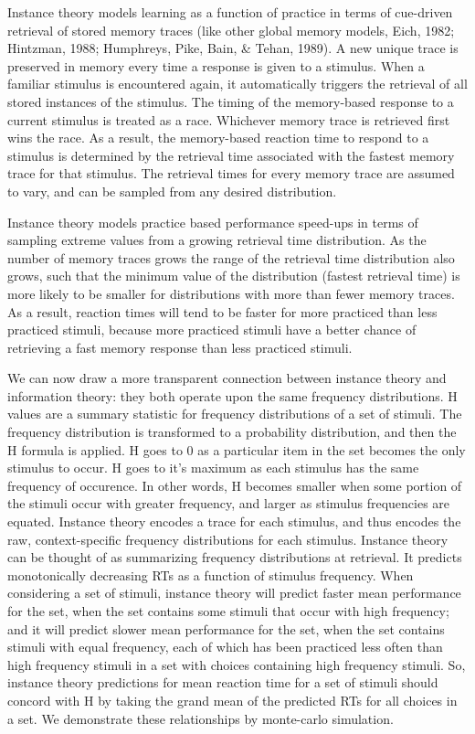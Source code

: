 \documentclass[,man,donotrepeattitle,floatsintext]{apa6}
\begin{document}
Instance theory models learning as a function of practice in terms of cue-driven retrieval of stored memory traces (like other global memory models, Eich, 1982; Hintzman, 1988; Humphreys, Pike, Bain, \& Tehan, 1989). A new unique trace is preserved in memory every time a response is given to a stimulus. When a familiar stimulus is encountered again, it automatically triggers the retrieval of all stored instances of the stimulus. The timing of the memory-based response to a current stimulus is treated as a race. Whichever memory trace is retrieved first wins the race. As a result, the memory-based reaction time to respond to a stimulus is determined by the retrieval time associated with the fastest memory trace for that stimulus. The retrieval times for every memory trace are assumed to vary, and can be sampled from any desired distribution.

Instance theory models practice based performance speed-ups in terms of sampling extreme values from a growing retrieval time distribution. As the number of memory traces grows the range of the retrieval time distribution also grows, such that the minimum value of the distribution (fastest retrieval time) is more likely to be smaller for distributions with more than fewer memory traces. As a result, reaction times will tend to be faster for more practiced than less practiced stimuli, because more practiced stimuli have a better chance of retrieving a fast memory response than less practiced stimuli.

We can now draw a more transparent connection between instance theory and information theory: they both operate upon the same frequency distributions. H values are a summary statistic for frequency distributions of a set of stimuli. The frequency distribution is transformed to a probability distribution, and then the H formula is applied. H goes to 0 as a particular item in the set becomes the only stimulus to occur. H goes to it's maximum as each stimulus has the same frequency of occurence. In other words, H becomes smaller when some portion of the stimuli occur with greater frequency, and larger as stimulus frequencies are equated. Instance theory encodes a trace for each stimulus, and thus encodes the raw, context-specific frequency distributions for each stimulus. Instance theory can be thought of as summarizing frequency distributions at retrieval. It predicts monotonically decreasing RTs as a function of stimulus frequency. When considering a set of stimuli, instance theory will predict faster mean performance for the set, when the set contains some stimuli that occur with high frequency; and it will predict slower mean performance for the set, when the set contains stimuli with equal frequency, each of which has been practiced less often than high frequency stimuli in a set with choices containing high frequency stimuli. So, instance theory predictions for mean reaction time for a set of stimuli should concord with H by taking the grand mean of the predicted RTs for all choices in a set. We demonstrate these relationships by monte-carlo simulation.
\end{document}
